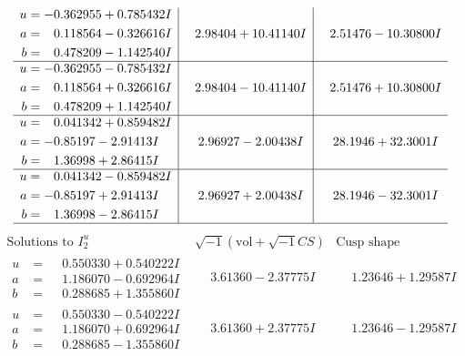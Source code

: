 \documentclass[1p]{elsarticle_modified}
\theoremstyle{definition}
\newcommand{\I}{\sqrt{-1}}
\begin{document}
$$\begin{array}{c|c|c}
\begin{aligned}
u &= -0.362955 + 0.785432 I \\
a &= \phantom{-}0.118564 - 0.326616 I \\
b &= \phantom{-}0.478209 - 1.142540 I\end{aligned}
 & \phantom{-}2.98404 + 10.41140 I & \phantom{-}2.51476 - 10.30800 I \\ \hline\begin{aligned}
u &= -0.362955 - 0.785432 I \\
a &= \phantom{-}0.118564 + 0.326616 I \\
b &= \phantom{-}0.478209 + 1.142540 I\end{aligned}
 & \phantom{-}2.98404 - 10.41140 I & \phantom{-}2.51476 + 10.30800 I \\ \hline\begin{aligned}
u &= \phantom{-}0.041342 + 0.859482 I \\
a &= -0.85197 - 2.91413 I \\
b &= \phantom{-}1.36998 + 2.86415 I\end{aligned}
 & \phantom{-}2.96927 - 2.00438 I & \phantom{-}28.1946 + 32.3001 I \\ \hline\begin{aligned}
u &= \phantom{-}0.041342 - 0.859482 I \\
a &= -0.85197 + 2.91413 I \\
b &= \phantom{-}1.36998 - 2.86415 I\end{aligned}
 & \phantom{-}2.96927 + 2.00438 I & \phantom{-}28.1946 - 32.3001 I\\
 \hline 
 \end{array}$$\newpage$$\begin{array}{c|c|c}  
\text{Solutions to }I^u_{2}& \I (\text{vol} + \sqrt{-1}CS) & \text{Cusp shape}\\
 \hline 
\begin{aligned}
u &= \phantom{-}0.550330 + 0.540222 I \\
a &= \phantom{-}1.186070 - 0.692964 I \\
b &= \phantom{-}0.288685 + 1.355860 I\end{aligned}
 & \phantom{-}3.61360 - 2.37775 I & \phantom{-}1.23646 + 1.29587 I \\ \hline\begin{aligned}
u &= \phantom{-}0.550330 - 0.540222 I \\
a &= \phantom{-}1.186070 + 0.692964 I \\
b &= \phantom{-}0.288685 - 1.355860 I\end{aligned}
 & \phantom{-}3.61360 + 2.37775 I & \phantom{-}1.23646 - 1.29587 I \\ \hline\begin{aligned}

\end{aligned}
\end{array}$$
\end{document}
